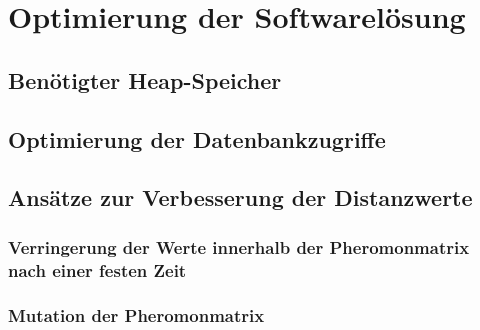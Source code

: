 \chapter{Optimierung der Softwarelösung}
\label{optimierung}
\section{Benötigter Heap-Speicher}

\section{Optimierung der Datenbankzugriffe}

\section{Ansätze zur Verbesserung der Distanzwerte}

\subsection{Verringerung der Werte innerhalb der Pheromonmatrix nach einer festen Zeit}

\subsection{Mutation der Pheromonmatrix}